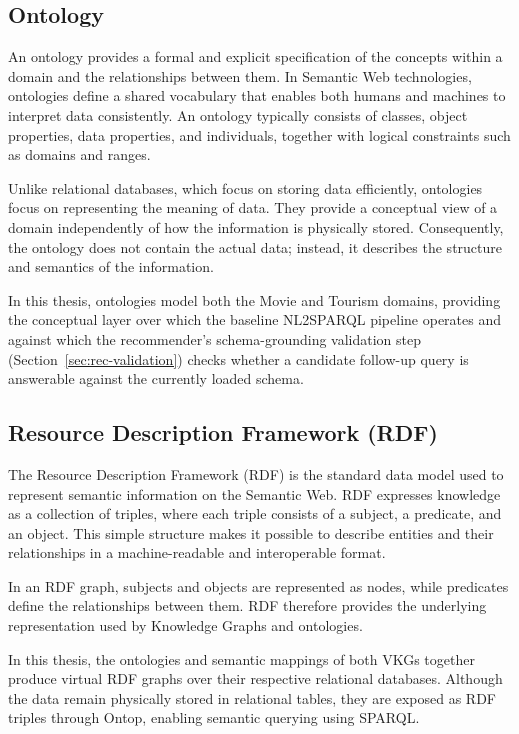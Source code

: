 \subsection{Ontology}
An ontology provides a formal and explicit specification of the concepts within a domain and the relationships between them. In Semantic Web technologies, ontologies define a shared vocabulary that enables both humans and machines to interpret data consistently. An ontology typically consists of classes, object properties, data properties, and individuals, together with logical constraints such as domains and ranges.

Unlike relational databases, which focus on storing data efficiently, ontologies focus on representing the meaning of data. They provide a conceptual view of a domain independently of how the information is physically stored. Consequently, the ontology does not contain the actual data; instead, it describes the structure and semantics of the information.

In this thesis, ontologies model both the Movie and Tourism domains, providing the conceptual layer over which the baseline NL2SPARQL pipeline operates and against which the recommender's schema-grounding validation step (Section~\ref{sec:rec-validation}) checks whether a candidate follow-up query is answerable against the currently loaded schema.

\subsection{Resource Description Framework (RDF)}

The Resource Description Framework (RDF) is the standard data model used to represent semantic information on the Semantic Web. RDF expresses knowledge as a collection of triples, where each triple consists of a subject, a predicate, and an object. This simple structure makes it possible to describe entities and their relationships in a machine-readable and interoperable format.

In an RDF graph, subjects and objects are represented as nodes, while predicates define the relationships between them. RDF therefore provides the underlying representation used by Knowledge Graphs and ontologies.

In this thesis, the ontologies and semantic mappings of both VKGs together produce virtual RDF graphs over their respective relational databases. Although the data remain physically stored in relational tables, they are exposed as RDF triples through Ontop, enabling semantic querying using SPARQL.

